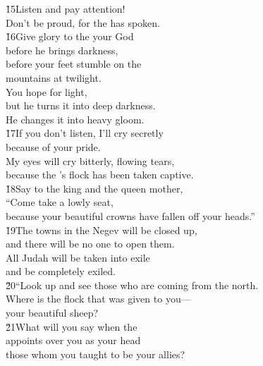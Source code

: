 \begin{poetry}
\poeml \v{15}Listen and pay attention! \\
\poemll    Don't be proud, for the  has spoken. \\
\poeml \v{16}Give glory to the  your God \\
\poemll    before he brings darkness, \\
\poeml before your feet stumble on the \\
\poemll    mountains at twilight. \\
\poeml You hope for light, \\
\poemll    but he turns it into deep darkness. \\
\poemlll       He changes it into heavy gloom. \\
\poeml \v{17}If you don't listen, I'll cry secretly \\
\poemll    because of your pride. \\
\poeml My eyes will cry bitterly, flowing tears, \\
\poemll    because the 's flock has been taken captive. \\
\poeml \v{18}Say to the king and the queen mother, \\
\poemll    ``Come take a lowly seat, \\
\poeml because your beautiful crowns have fallen off your heads.'' \\
\poeml \v{19}The towns in the Negev will be closed up, \\
\poemll    and there will be no one to open them. \\
\poeml All Judah will be taken into exile \\
\poemll    and be completely exiled. \\
\poeml \v{20}``Look up and see those who are coming from the north. \\
\poemll    Where is the flock that was given to you--- \\
\poemlll       your beautiful sheep? \\
\poeml \v{21}What will you say when the  \\
\poemll    appoints over you as your head \\
\poemlll       those whom you taught to be your allies? \\

\end{poetry}
